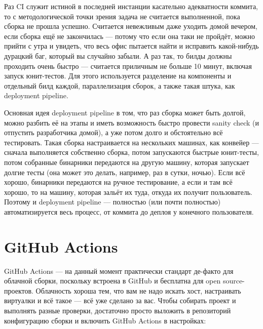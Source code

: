 \documentclass[a5paper]{article}
\begin{document}
Раз CI служит истиной в последней инстанции касательно адекватности коммита, то с методологической точки зрения задача не считается выполненной, пока сборка не прошла успешно. Считается невежливым даже уходить домой вечером, если сборка ещё не закончилась --- потому что если она таки не пройдёт, можно прийти с утра и увидеть, что весь офис пытается найти и исправить какой-нибудь дурацкий баг, который вы случайно забыли. А раз так, то билды должны проходить очень быстро --- считается приличным не больше 10 минут, включая запуск юнит-тестов. Для этого используется разделение на компоненты и отдельный билд каждой, параллелизация сборок, а также такая штука, как deployment pipeline.

Основная идея deployment pipeline в том, что раз сборка может быть долгой, можно разбить её на этапы и иметь возможность быстро провести sanity check (и отпустить разработчика домой), а уже потом долго и обстоятельно всё тестировать. Такая сборка настраивается на нескольких машинах, как конвейер --- сначала выполняется собственно сборка, потом запускаются быстрые юнит-тесты, потом собранные бинарники передаются на другую машину, которая запускает долгие тесты (она может это делать, например, раз в сутки, ночью). Если всё хорошо, бинарники передаются на ручное тестирование, а если и там всё хорошо, то на машину, которая зальёт их туда, откуда их получит пользователь. Поэтому и deployment pipeline --- полностью (или почти полностью) автоматизируется весь процесс, от коммита до деплоя у конечного пользователя.

\section{GitHub Actions}

GitHub Actions --- на данный момент практически стандарт де-факто для облачной сборки, поскольку встроена в GitHub и бесплатна для open source-проектов. Облачность хороша тем, что вам не надо искать хост, настраивать виртуалки и всё такое --- всё уже сделано за вас. Чтобы собирать проект и выполнять разные проверки, достаточно просто выложить в репозиторий конфигурацию сборки и включить GitHub Actions в настройках:
\end{document}
